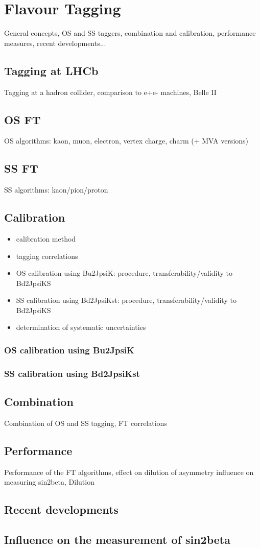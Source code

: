 
\chapter{Flavour Tagging}
General concepts, OS and SS taggers, combination and calibration, performance measures, recent developments...
\section{Tagging at LHCb}
Tagging at a hadron collider, comparison to e+e- machines, Belle II
\section{OS FT}
OS algorithms: kaon, muon, electron, vertex charge, charm (+ MVA versions)
\section{SS FT}
SS algorithms: kaon/pion/proton
\section{Calibration}
\begin{itemize}
  \item calibration method
  \item tagging correlations
  \item OS calibration using Bu2JpsiK: procedure, transferability/validity to Bd2JpsiKS
  \item SS calibration using Bd2JpsiKst: procedure, transferability/validity to Bd2JpsiKS
  \item determination of systematic uncertainties
\end{itemize}
\subsection{OS calibration using Bu2JpsiK}
\subsection{SS calibration using Bd2JpsiKst}
\section{Combination}
Combination of OS and SS tagging, FT correlations
\section{Performance}
Performance of the FT algorithms, effect on dilution of asymmetry
influence on measuring sin2beta, Dilution
\section{Recent developments}
\section{Influence on the measurement of sin2beta}